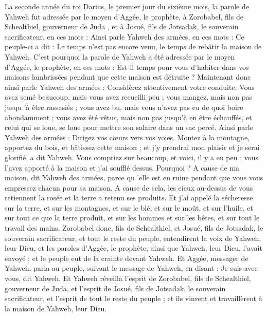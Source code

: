 \begin{multicols}{2}
\VerseOne{}La seconde année du roi Darius, le premier jour du sixième mois, la parole de Yahweh fut adressée par le moyen d'Aggée, le prophète, à Zorobabel, fils de Schealthiel, gouverneur de Juda , et à Josué, fils de Jotsadak, le souverain sacrificateur, en ces mots :
Ainsi parle Yahweh des armées, en ces mots : Ce peuple-ci a dit : Le temps n'est pas encore venu, le temps de rebâtir la maison de Yahweh.
C'est pourquoi la parole de Yahweh a été adressée par le moyen d'Aggée, le prophète, en ces mots :
Est-il temps pour vous d'habiter dans vos maisons lambrissées pendant que cette maison est détruite ?
Maintenant donc ainsi parle Yahweh des armées : Considérez attentivement votre conduite.
Vous avez semé beaucoup, mais vous avez recueilli peu ; vous mangez, mais non pas jusqu 'à être rassasiés ; vous avez bu, mais vous n'avez pas eu de quoi boire abondamment ; vous avez été vêtus, mais non pas jusqu'à en être échauffés, et celui qui se loue, se loue pour mettre son salaire dans un sac percé.
Ainsi parle Yahweh des armées : Dirigez vos cœurs vers vos voies.
Montez à la montagne, apportez du bois, et bâtissez cette maison ; et j'y prendrai mon plaisir et je serai glorifié, a dit Yahweh.
Vous comptiez sur beaucoup, et voici, il y a eu peu ; vous l'avez apporté à la maison et j'ai soufflé dessus. Pourquoi ? A cause de ma maison, dit Yahweh des armées, parce qu 'elle est en ruine pendant que vous vous empressez chacun pour sa maison.
A cause de cela, les cieux au-dessus de vous retiennent la rosée et la terre a retenu ses produits.
Et j'ai appelé la sécheresse sur la terre, et sur les montagnes, et sur le blé, et sur le moût, et sur l'huile, et sur tout ce que la terre produit, et sur les hommes et sur les bêtes, et sur tout le travail des mains.
Zorobabel donc, fils de Schealthiel, et Josué, fils de Jotsadak, le souverain sacrificateur, et tout le reste du peuple, entendirent la voix de Yahweh, leur Dieu, et les paroles d'Aggée, le prophète, ainsi que Yahweh, leur Dieu, l'avait envoyé ; et le peuple eut de la crainte devant Yahweh.
Et Aggée, messager de Yahweh, parla au peuple, suivant le message de Yahweh, en disant : Je suis avec vous, dit Yahweh.
Et Yahweh réveilla l'esprit de Zorobabel, fils de Schealthiel, gouverneur de Juda, et l'esprit de Josué, fils de Jotsadak, le souverain sacrificateur, et l'esprit de tout le reste du peuple ; et ils vinrent et travaillèrent à la maison de Yahweh, leur Dieu.

\end{multicols}
